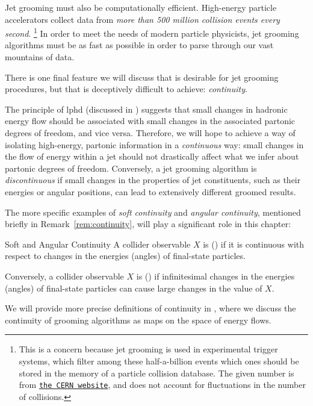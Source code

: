 Jet grooming must also be computationally efficient.
%
High-energy particle accelerators collect data from \textit{more than 500 million collision events every second}.%
\footnote{
    This is a concern because jet grooming is used in experimental trigger systems, which filter among these half-a-billion events which ones should be stored in the memory of a particle collision database.
    The given number is from \href{http://lhc-machine-outreach.web.cern.ch/collisions.htm}{\texttt{the CERN website}}, and does not account for fluctuations in the number of collisions.
}
%
In order to meet the needs of modern particle physicists, jet grooming algorithms must be as fast as possible in order to parse through our vast mountains of data.


There is one final feature we will discuss that is desirable for jet grooming procedures, but that is deceptively difficult to achieve:
%
\textit{continuity}.


The principle of \gls{lphd} (discussed in ) suggests that small changes in hadronic energy flow should be associated with small changes in the associated partonic degrees of freedom, and vice versa.
%
Therefore, we will hope to achieve a way of isolating high-energy, partonic information in a \textit{continuous} way:
%
small changes in the flow of energy within a jet should not drastically affect what we infer about partonic degrees of freedom.
%
Conversely, a jet grooming algorithm is \textit{discontinuous} if small changes in the properties of jet constituents, such as their energies or angular positions, can lead to extensively different groomed results.

The more specific examples of \textit{soft continuity} and \textit{angular continuity}, mentioned briefly in Remark~\ref{rem:continuity}, will play a significant role in this chapter:
\begin{definitionbox}{Soft and Angular Continuity}{}
    A collider observable \(X\) is  () if it is continuous with respect to changes in the energies (angles) of final-state particles.

    Conversely, a collider observable \(X\) is  () if infinitesimal changes in the energies (angles) of final-state particles can cause large changes in the value of \(X\).
\end{definitionbox}
\noindent
We will provide more precise definitions of continuity in , where we discuss the continuity of grooming algorithms as maps on the space of energy flows.



